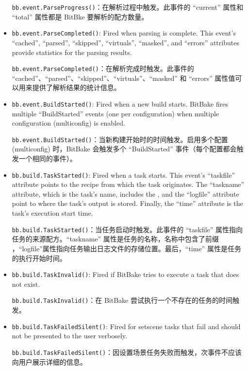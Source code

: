 \begin{itemize}
\medskip
\texttt{bb.event.ParseProgress()}：在解析过程中触发。此事件的 ``current'' 属性和 ``total'' 属性都是 BitBke 要解析的配方数量。

\item \texttt{bb.event.ParseCompleted()}: Fired when parsing is complete. This event's ``cached'', ``parsed'', ``skipped'', ``virtuals'', ``masked'', and ``errors'' attributes provide statistics for the parsing results.

\medskip
\texttt{bb.event.ParseCompleted()}：在解析完成时触发。此事件的 ``cached''、``parsed''、``skipped''、``virtuals''、``masked'' 和 ``errors'' 属性值可以用来提供了解析结果的统计信息。

\item \texttt{bb.event.BuildStarted()}: Fired when a new build starts. BitBake fires multiple ``BuildStarted'' events (one per configuration) when multiple configuration (multiconfig) is enabled.

\medskip
\texttt{bb.event.BuildStarted()}：当新构建开始时的时间触发。启用多个配置 (multiconfig) 时，BitBake 会触发多个 ``BuildStarted'' 事件（每个配置都会触发一个相同的事件）。

\item \texttt{bb.build.TaskStarted()}: Fired when a task starts. This event's ``taskfile'' attribute points to the recipe from which the task originates. The ``taskname'' attribute, which is the task's name, includes the , and the ``logfile'' attribute point to where the task's output is stored. Finally, the ``time'' attribute is the task's execution start time.

\medskip
\texttt{bb.build.TaskStarted()}：当任务启动时触发。此事件的 ``taskfile'' 属性指向任务的来源配方。``taskname'' 属性是任务的名称，名称中包含了前缀 ，``logfile''属性指向任务输出日志文件的存储位置。最后，``time'' 属性是任务的执行开始时间。

\item \texttt{bb.build.TaskInvalid()}: Fired if BitBake tries to execute a task that does not exist.

\medskip
\texttt{bb.build.TaskInvalid()}：在 BitBake 尝试执行一个不存在的任务的时间触发。

\item \texttt{bb.build.TaskFailedSilent()}: Fired for setscene tasks that fail and should not be presented to the user verbosely.

\medskip
\texttt{bb.build.TaskFailedSilent()}：因设置场景任务失败而触发，次事件不应该向用户展示详细的信息。


\end{itemize}
